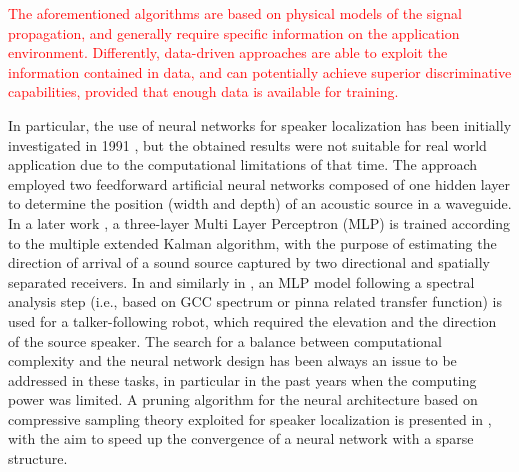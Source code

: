 \documentclass[review]{elsarticle}
\begin{document}

\textcolor{red}{The aforementioned algorithms are based on physical models of the signal propagation, and generally require specific information on the application environment. Differently, data-driven approaches are able to exploit the information contained in data, and can potentially achieve superior discriminative capabilities, provided that enough data is available for training.}


In particular, the use of neural networks for speaker localization has been initially investigated in 1991 \cite{zakarauskas1991artificial}, but the obtained results were not suitable for real world application due to the computational limitations of that time. The approach employed two feedforward artificial neural networks composed of one hidden layer to determine the position (width and depth) of an acoustic source in a waveguide.  In a later work \cite{datum1996artificial}, a three-layer Multi Layer Perceptron (MLP) is trained according to the multiple extended Kalman algorithm, with the purpose of estimating the direction of arrival of a sound source captured by two directional and spatially separated receivers. In \cite{Mumolo200369} and similarly in \cite{murray2011neural}, an MLP model following a spectral analysis step (i.e., based on GCC spectrum or pinna related transfer function) is used for a talker-following robot, which required the elevation and the direction of the source speaker. The search for a balance between computational complexity and the neural network design has been always an issue to be addressed in these tasks, in particular in the past years when the computing power was limited.  A pruning algorithm for the neural architecture based on compressive sampling theory exploited for speaker localization is presented in \cite{dehkordi2011compressive}, with the aim to speed up the convergence of a neural network with a sparse structure. 
\end{document}
